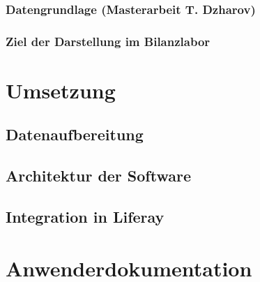 \subsection{Datengrundlage (Masterarbeit T. Dzharov)}
 
\subsection{Ziel der Darstellung im Bilanzlabor}

\chapter{Umsetzung}

\section{Datenaufbereitung}
\section{Architektur der Software}
\section{Integration in Liferay}

\chapter{Anwenderdokumentation}

